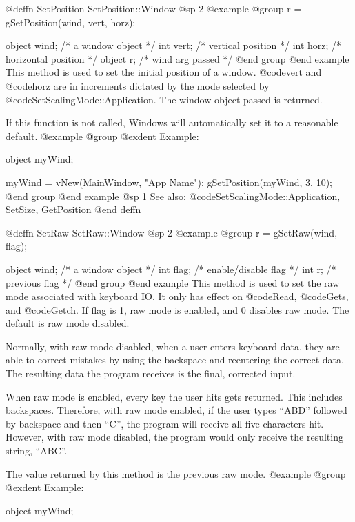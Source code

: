 @deffn {SetPosition} SetPosition::Window
@sp 2
@example
@group
r = gSetPosition(wind, vert, horz);

object  wind;   /*  a window object     */
int     vert;   /*  vertical position   */
int     horz;   /*  horizontal position */
object  r;      /*  wind arg passed     */
@end group
@end example
This method is used to set the initial position of a window.
@code{vert} and @code{horz} are in increments dictated by the
mode selected by @code{SetScalingMode::Application}.  The window
object passed is returned.

If this function is not called, Windows will automatically set it to a
reasonable default.
@example
@group
@exdent Example:

object  myWind;

myWind = vNew(MainWindow, "App Name");
gSetPosition(myWind, 3, 10);
@end group
@end example
@sp 1
See also:  @code{SetScalingMode::Application, SetSize, GetPosition}
@end deffn











@deffn {SetRaw} SetRaw::Window
@sp 2
@example
@group
r = gSetRaw(wind, flag);

object  wind;   /*  a window object     */
int     flag;   /*  enable/disable flag */
int     r;      /*  previous flag       */
@end group
@end example
This method is used to set the raw mode associated with keyboard
IO.  It only has effect on @code{Read}, @code{Gets}, and @code{Getch}.
If flag is 1, raw mode is enabled, and 0 disables raw mode.  The
default is raw mode disabled.

Normally, with raw mode disabled, when a user enters keyboard data,
they are able to correct mistakes by using the backspace and reentering
the correct data.  The resulting data the program receives is the
final, corrected input.

When raw mode is enabled, every key the user hits gets returned.  This
includes backspaces.  Therefore, with raw mode enabled, if the user types
``ABD'' followed by backspace and then ``C'', the program will receive all
five characters hit.  However, with raw mode disabled, the program would
only receive the resulting string, ``ABC''.

The value returned by this method is the previous raw mode.
@example
@group
@exdent Example:

object  myWind;

